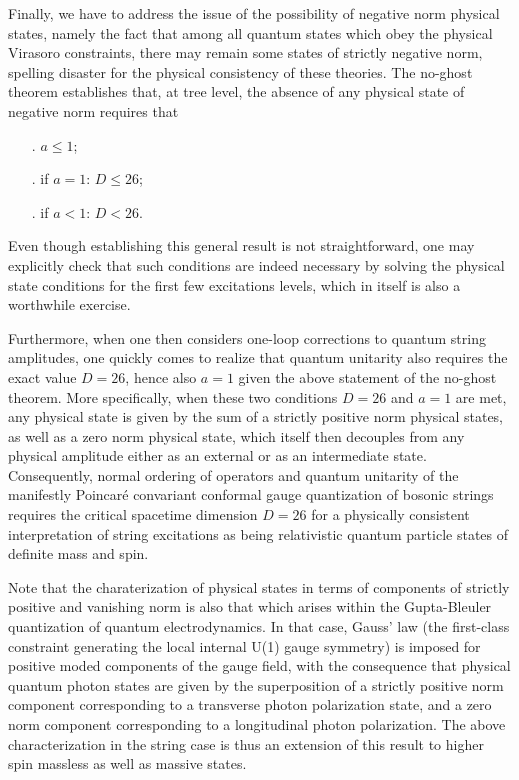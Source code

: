 \documentclass[a4paper,11pt]{article}
\begin{document}
Finally, we have to address the issue of the possibility of negative norm
physical states, namely the fact that among all quantum states which obey
the physical Virasoro constraints, there may remain some states of 
strictly negative 
norm, spelling disaster for the physical consistency of these theories.
The no-ghost theorem\cite{Pol,GSW,JG10} establishes that, at tree level, 
the absence of any physical state of negative norm requires that
\begin{itemize}
\item[.] $a\le 1$;
\item[.] if $a=1$: $D\le 26$;
\item[.] if $a<1$: $D< 26$.
\end{itemize}
Even though establishing this general result is not straightforward, one
may explicitly check that such conditions are indeed necessary by solving
the phy\-si\-cal state conditions for the first few excitations levels, which
in itself is also a worthwhile exercise.

Furthermore, when one then considers one-loop corrections to quantum
string amplitudes, one quickly comes to realize that quantum unitarity also
requires\cite{Pol,GSW} the exact value $D=26$, hence also $a=1$ given 
the above statement
of the no-ghost theorem. More specifically, when these two conditions
$D=26$ and $a=1$ are met, any physical state is given by the sum of a strictly
positive norm physical states, as well as a zero norm physical state,
which itself then decouples from any physical amplitude either as an
external or as an intermediate state. Consequently, normal ordering of
operators and quantum unitarity of the manifestly Poincar\'e convariant
conformal gauge quantization of bosonic strings requires the critical
spacetime dimension $D=26$ for a physically consistent interpretation
of string excitations as being relativistic quantum particle states of
definite mass and spin.

Note that the charaterization of physical states in terms of components
of strictly positive and vanishing norm is also that which arises within
the Gupta-Bleuler quantization of quantum electrodynamics. In that case,
Gauss' law (the first-class constraint generating the local internal U(1)
gauge symmetry) is imposed for positive moded components of the gauge field,
with the consequence that physical quantum photon states are given by
the superposition of a strictly positive norm component corresponding to a
transverse photon polarization state, and a zero norm component corresponding
to a longitudinal photon polarization. The above characterization in the
string case is thus an extension of this result to higher spin massless 
as well as massive states.
\end{document}
